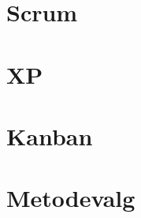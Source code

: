\section{Scrum}\label{sec:scrum}

\section{XP}\label{sec:xp}

\section{Kanban}\label{sec:kanban}

\section{Metodevalg}\label{sec:valgafvaektoej}